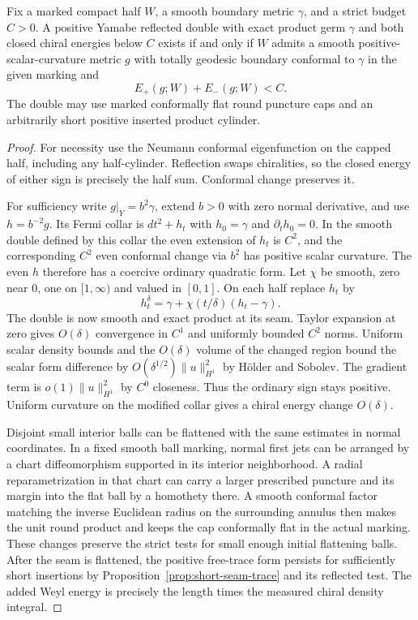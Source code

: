\begin{proposition}
\label{prop:totally-geodesic-half-filling}
Fix a marked compact half \(W\), a smooth boundary metric
\(\gamma\), and a strict budget \(C>0\). A positive Yamabe
reflected double with exact product germ \(\gamma\) and both
closed chiral energies below \(C\) exists if and only if
\(W\) admits a smooth positive-scalar-curvature metric \(g\)
with totally geodesic boundary conformal to \(\gamma\) in the
given marking and
\[
 E_+(g;W)+E_-(g;W)<C.
\]
The double may use marked conformally flat round puncture caps
and an arbitrarily short positive inserted product cylinder.
\end{proposition}

\begin{proof}
For necessity use the Neumann conformal eigenfunction on the
capped half, including any half-cylinder. Reflection swaps
chiralities, so the closed energy of either sign is precisely
the half sum. Conformal change preserves it.

For sufficiency write \(g|_Y=b^2\gamma\), extend \(b>0\)
with zero normal derivative, and use \(h=b^{-2}g\).
Its Fermi collar is \(dt^2+h_t\) with \(h_0=\gamma\) and
\(\partial_t h_0=0\). In the smooth double defined by this
collar the even extension of \(h_t\) is \(C^2\), and the
corresponding \(C^2\) even conformal change via \(b^2\)
has positive scalar curvature. The even \(h\) therefore
has a coercive ordinary quadratic form.
Let \(\chi\) be smooth, zero near \(0\), one on \([1,\infty)\)
and valued in \([0,1]\). On each half replace \(h_t\) by
\[
 h_t^\delta=\gamma+\chi(t/\delta)(h_t-\gamma).
\]
The double is now smooth and exact product at its seam.
Taylor expansion at zero gives \(O(\delta)\) convergence in
\(C^1\) and uniformly bounded \(C^2\) norms. Uniform scalar
density bounds and the \(O(\delta)\) volume of the changed
region bound the scalar form difference by
\(O(\delta^{1/2})\|u\|_{H^1}^2\) by H\"older and Sobolev.
The gradient term is \(o(1)\|u\|_{H^1}^2\) by \(C^0\)
closeness. Thus the ordinary
sign stays positive. Uniform curvature on the modified
collar gives a chiral energy change \(O(\delta)\).

Disjoint small interior balls can be flattened with the same
estimates in normal coordinates. In a fixed smooth ball
marking, normal first jets can be arranged by a chart
diffeomorphism supported in its interior neighborhood.
A radial reparametrization in that chart can carry a larger
prescribed puncture and its margin into the flat ball by a
homothety there. A smooth conformal factor matching the inverse
Euclidean radius on the surrounding annulus then makes the
unit round product and keeps the cap conformally flat in the
actual marking. These changes preserve the strict tests for
small enough initial flattening balls. After the seam is
flattened, the positive free-trace form persists for sufficiently
short insertions by Proposition~\ref{prop:short-seam-trace}
and its reflected test. The added Weyl energy is precisely
the length times the measured chiral density integral.
\end{proof}

